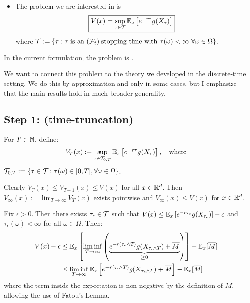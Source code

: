 \begin{itemize}
    \item The problem we are interested in is
    \begin{equation*}
        \boxed{V(x) = \sup_{\tau \in \mathcal{T}} \mathbb E_x \left[ e^{-r\tau} g(X_\tau) \right]}
    \end{equation*}
    where $\mathcal{T} := \{ \tau : \tau \text{ is an } (\mathcal{F}_t)\text{-stopping time with } \tau(\omega) < \infty \text{ } \forall \omega \in \Omega \}$.
\end{itemize}

\begin{remark}
    In the current formulation, the problem is .
\end{remark}

\begin{remark*}[Aims]
    We want to connect this problem to the theory we developed in the discrete-time setting. We do this by approximation and only in some cases, but I emphasize that the main results hold in much broader generality.
\end{remark*}

\subsection*{Step 1: (time-truncation)}

For $T \in \mathbb N$, define:
\begin{equation*}
    V_T(x) := \sup_{\tau \in \mathcal{T}_{0,T}} \mathbb E_x \left[ e^{-r\tau} g(X_\tau) \right], \quad \text{where}
\end{equation*}
$\mathcal{T}_{0,T} := \{ \tau \in \mathcal{T} : \tau(\omega) \in [0,T], \forall \omega \in \Omega \}$.

Clearly $V_T(x) \leq V_{T+1}(x) \leq V(x)$ for all $x \in \mathbb R^d$. Then $V_\infty(x) := \lim_{T \to \infty} V_T(x)$ exists pointwise and $V_\infty(x) \leq V(x)$ for $x \in \mathbb R^d$.

Fix $\epsilon > 0$. Then there exists $\tau_\epsilon \in \mathcal{T}$ such that $V(x) \leq \mathbb E_x \left[ e^{-r\tau_\epsilon} g(X_{\tau_\epsilon}) \right] + \epsilon$ and $\tau_\epsilon(\omega) < \infty$ for all $\omega \in \Omega$. Then:
\begin{align*}
    V(x) - \epsilon &\leq \mathbb E_x \left[ \liminf_{T \to \infty} \left( \underbrace{e^{-r(\tau_\epsilon \wedge T)} g(X_{\tau_\epsilon \wedge T}) + \overline{M}}_{\geq 0} \right) \right] - \mathbb E_x[\overline{M}] \\
    &\leq \liminf_{T \to \infty} \mathbb E_x \left[ e^{-r(\tau_\epsilon \wedge T)} g(X_{\tau_\epsilon \wedge T}) + \overline{M} \right] - \mathbb E_x[\overline{M}]
\end{align*}
where the term inside the expectation is non-negative by the definition of $\overline{M}$, allowing the use of Fatou's Lemma.

